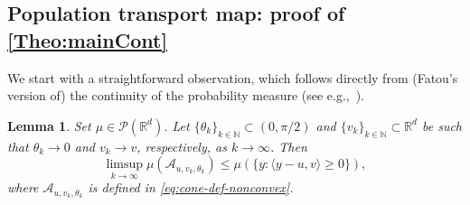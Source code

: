 \documentclass[11pt]{article}
\newcommand{\R}{\mathbb{R}}
\newcommand{\N}{\mathbb{N}}
\theoremstyle{plain}
\newtheorem{lemma}[sectioncount]{Lemma}
\theoremstyle{definition}
\begin{document}
\subsection{Population transport map: proof of \autoref{Theo:mainCont}}\label{Sect:proofCont}
We start with a straightforward observation, which follows directly from  {  (Fatou’s version of) the continuity of the probability measure (see e.g.,~\cite[Theorem 4.1]{Billingsley.1995}).}
\begin{lemma}\label{lemma:ConvergenceToOneHalph}
  Set $\mu\in \mathcal{P}(\R^d)$.  Let $\{\theta_k\}_{k\in \N}\subset (0,\pi/2)$ and $\{v_k\}_{k\in \N}\subset \mathbb{R}^d$ be such that  $ \theta_k\to 0$ and $ v_k\to v$, respectively, as $k\to \infty$. Then
$$ \limsup_{k\to \infty} \mu(\mathcal{A}_{u,v_k, \theta_k}) \leq \mu(\{ y: 
      \langle  y-u, v\rangle\geq 
0  \} ), $$
 {where $\mathcal{A}_{u,v_k, \theta_k}$ is defined in \eqref{eq:cone-def-nonconvex}.}
\end{lemma}
\end{document}
